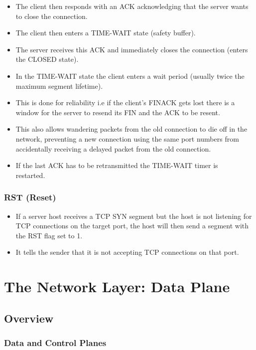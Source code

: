 \documentclass{article}
\begin{document}
\begin{itemize}
    \item The client then responds with an ACK acknowledging that the server wants to close the connection.
    \item The client then enters a TIME-WAIT state (safety buffer).
    \item The server receives this ACK and immediately closes the connection (enters the CLOSED state).
    \item In the TIME-WAIT state the client enters a wait period (usually twice the maximum segment lifetime).
    \item This is done for reliability i.e if the client's FINACK gets lost there is a window for the server to resend its FIN and the ACK to be resent.
    \item This also allows wandering packets from the old connection to die off in the network, preventing a new connection using the same port numbers from accidentally receiving a delayed packet from the old connection.
    \item If the last ACK has to be retransmitted the TIME-WAIT timer is \\ restarted.
\end{itemize}

\subsubsection{RST (Reset)}

\begin{itemize}
    \item If a server host receives a TCP SYN segment but the host is not listening for TCP connections on the target port, the host will then send a segment with the RST flag set to 1.
    \item It tells the sender that it is not accepting TCP connections on that port.
\end{itemize}

\section{The Network Layer: Data Plane}

\subsection{Overview}

\subsubsection{Data and Control Planes}
\end{document}
